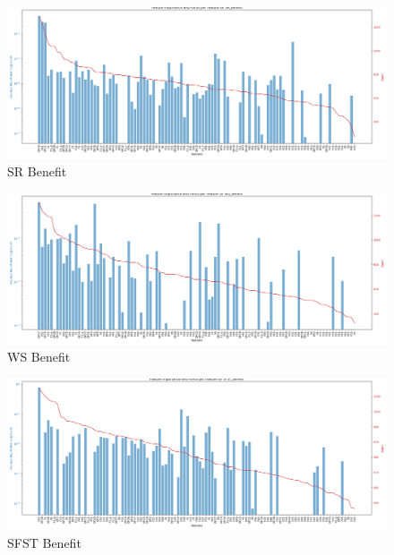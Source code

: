 \begin{figure}
    \centering
    \includegraphics[width=0.95\linewidth]{./causalml_section/graphs/feature_importance_points_plot_SR_Benefit.png}
    \caption{SR Benefit}
    \label{fig:sr_ben_causalml}
\end{figure}

\begin{figure}
    \centering
    \includegraphics[width=0.95\linewidth]{./causalml_section/graphs/feature_importance_points_plot_WS_Benefit.png}
    \caption{WS Benefit}
    \label{fig:ws_ben_causalml}
\end{figure}

\begin{figure}
    \centering
    \includegraphics[width=0.95\linewidth]{./causalml_section/graphs/feature_importance_points_plot_SFST_Benefit.png}
    \caption{SFST Benefit}
    \label{fig:sfst_ben_causalml}
\end{figure}


